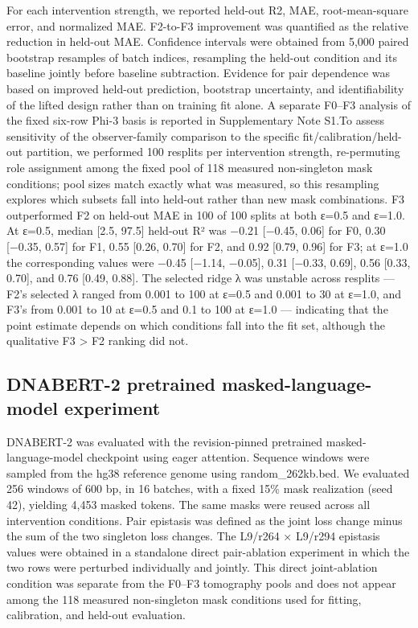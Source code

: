 \documentclass[11pt]{article}
\begin{document}
For each intervention strength, we reported held-out R2, MAE, root-mean-square error, and normalized MAE. F2-to-F3 improvement was quantified as the relative reduction in held-out MAE. Confidence intervals were obtained from 5,000 paired bootstrap resamples of batch indices, resampling the held-out condition and its baseline jointly before baseline subtraction. Evidence for pair dependence was based on improved held-out prediction, bootstrap uncertainty, and identifiability of the lifted design rather than on training fit alone. A separate F0–F3 analysis of the fixed six-row Phi-3 basis is reported in Supplementary Note S1.To assess sensitivity of the observer-family comparison to the specific fit/calibration/held-out partition, we performed 100 resplits per intervention strength, re-permuting role assignment among the fixed pool of 118 measured non-singleton mask conditions; pool sizes match exactly what was measured, so this resampling explores which subsets fall into held-out rather than new mask combinations. F3 outperformed F2 on held-out MAE in 100 of 100 splits at both ε=0.5 and ε=1.0. At ε=0.5, median [2.5, 97.5] held-out R² was −0.21 [−0.45, 0.06] for F0, 0.30 [−0.35, 0.57] for F1, 0.55 [0.26, 0.70] for F2, and 0.92 [0.79, 0.96] for F3; at ε=1.0 the corresponding values were −0.45 [−1.14, −0.05], 0.31 [−0.33, 0.69], 0.56 [0.33, 0.70], and 0.76 [0.49, 0.88]. The selected ridge λ was unstable across resplits — F2’s selected λ ranged from 0.001 to 100 at ε=0.5 and 0.001 to 30 at ε=1.0, and F3’s from 0.001 to 10 at ε=0.5 and 0.1 to 100 at ε=1.0 — indicating that the point estimate depends on which conditions fall into the fit set, although the qualitative F3 > F2 ranking did not.

\subsection*{DNABERT-2 pretrained masked-language-model experiment}
DNABERT-2 was evaluated with the revision-pinned pretrained masked-language-model checkpoint using eager attention. Sequence windows were sampled from the hg38 reference genome using random\_262kb.bed. We evaluated 256 windows of 600 bp, in 16 batches, with a fixed 15\% mask realization (seed 42), yielding 4,453 masked tokens. The same masks were reused across all intervention conditions. Pair epistasis was defined as the joint loss change minus the sum of the two singleton loss changes. The L9/r264 × L9/r294 epistasis values were obtained in a standalone direct pair-ablation experiment in which the two rows were perturbed individually and jointly. This direct joint-ablation condition was separate from the F0–F3 tomography pools and does not appear among the 118 measured non-singleton mask conditions used for fitting, calibration, and held-out evaluation.
\end{document}

